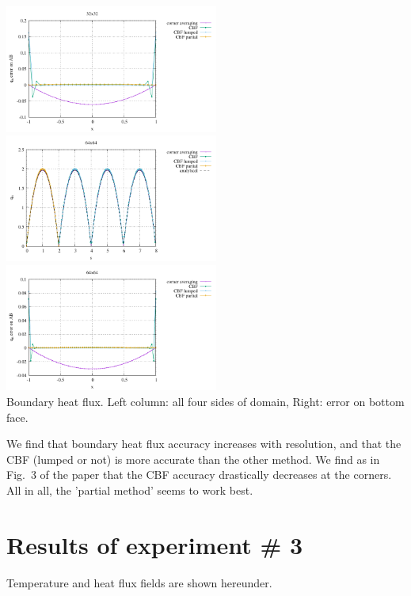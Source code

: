 \begin{center}
\includegraphics[width=7cm]{python_codes/fieldstone_173/results/exp2/heat_flux_boundary_bottom_32.pdf}\\
\includegraphics[width=7cm]{python_codes/fieldstone_173/results/exp2/heat_flux_boundary_64.pdf}
\includegraphics[width=7cm]{python_codes/fieldstone_173/results/exp2/heat_flux_boundary_bottom_64.pdf}\\
{\captionfont Boundary heat flux. Left column: all four sides of domain, Right: error on bottom face.}
\end{center}

We find that boundary heat flux accuracy increases with resolution, and that the 
CBF (lumped or not) is more accurate than the other method.
We find as in Fig.~3 of the paper that the CBF accuracy drastically decreases at the corners.
All in all, the 'partial method' seems to work best.



\newpage
\section*{Results of experiment \# 3}

Temperature and heat flux fields are shown hereunder. 


